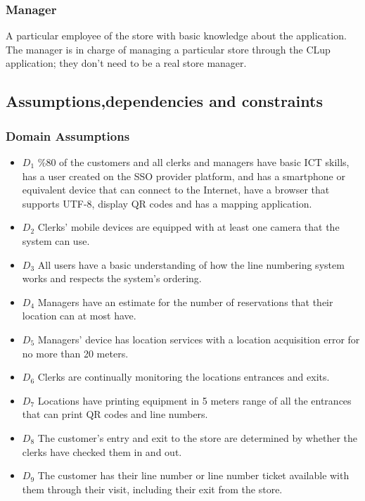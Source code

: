 \subsubsection {Manager}
A particular employee of the store with basic knowledge about the application.
The manager is in charge of managing a particular store through the CLup application; they don't need to be a real store manager.

\subsection{Assumptions,dependencies and constraints}


\subsubsection{Domain Assumptions}

\begin{itemize}
    \item \textbf{$D_1$} \%80 of the customers and all clerks and managers have basic ICT skills, has a user created on the SSO provider platform, and has a smartphone or equivalent device that can connect to the Internet, have a browser that supports UTF-8, display QR codes and has a mapping application.
    \item \textbf{$D_2$} Clerks' mobile devices are equipped with at least one camera that the system can use.
    \item \textbf{$D_3$} All users have a basic understanding of how the line numbering system works and respects the system's ordering.
    \item \textbf{$D_4$} Managers have an estimate for the number of reservations that their location can at most have.
    \item \textbf{$D_5$} Managers' device has location services with a location acquisition error for no more than 20 meters.
    \item \textbf{$D_6$} Clerks are continually monitoring the locations entrances and exits.
    \item \textbf{$D_7$} Locations have printing equipment in 5 meters range of all the entrances that can print QR codes and line numbers.
    \item \textbf{$D_8$} The customer's entry and exit to the store are determined by whether the clerks have checked them in and out.
    \item \textbf{$D_9$} The customer has their line number or line number ticket available with them through their visit, including their exit from the store.
\end{itemize}

